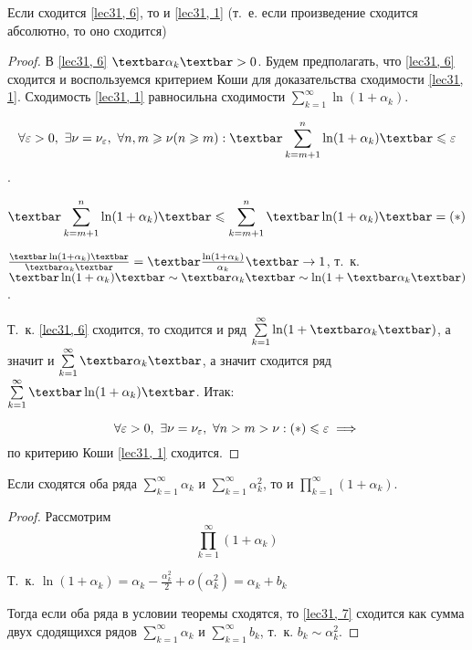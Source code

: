 \documentclass[../../main.tex]{subfiles}
\begin{document}
	\begin{thm}
		Если сходится \eqref{lec31, 6}, то и \eqref{lec31, 1} (т.~е. если 
		произведение сходится абсолютно, то оно сходится)
		\begin{proof}
			В \eqref{lec31, 6} $\textbar\alpha_k\textbar > 0$. Будем предполагать, что 
			\eqref{lec31, 6} сходится и воспользуемся критерием Коши для доказательства 
			сходимости \eqref{lec31, 1}. Сходимость \eqref{lec31, 1} равносильна 
			сходимости $\sum\limits_{k = 1}^{\infty} \ln (1 + \alpha_k)$.
			
			\[\forall \eps > 0,\ \exists \nu = \nu_\eps,\ \forall n, m 
			\geq \nu (n \geq m): \textbar\sum\limits_{k = m + 1}^{n} \ln(1 + 
			\alpha_k)\textbar \leq \eps\].
			
			\[\textbar\sum\limits_{k = m + 1}^{n} \ln(1 + \alpha_k) \textbar \leq 
			\sum\limits_{k = m + 1}^{n} \textbar\ln(1 + \alpha_k)\textbar = (*)\]
			
			$\frac{\textbar\ln(1 + \alpha_k)\textbar}{\textbar\alpha_k\textbar} = 
			\textbar \frac{\ln(1 + \alpha_k)}{\alpha_k}\textbar \to 1$, т.~к. $\textbar 
			\ln(1 + \alpha_k) \textbar \sim \textbar \alpha_k \textbar \sim \ln(1 + 
			\textbar \alpha_k \textbar)$.
			
			Т.~к. \eqref{lec31, 6} сходится, то сходится и ряд $\sum\limits_{k = 
			1}^{\infty} \ln(1 + \textbar \alpha_k \textbar)$, а значит и 
			$\sum\limits_{k = 1}^{\infty} \textbar \alpha_k \textbar$, а значит 
			сходится ряд $\sum\limits_{k = 1}^{\infty} \textbar \ln(1 + \alpha_k) 
			\textbar$. Итак:
			
			\[\forall \varepsilon > 0,\ \exists \nu = \nu_\varepsilon,\ \forall n > m > 
			\nu: (*) \leqslant \varepsilon \implies\]
			по критерию Коши \eqref{lec31, 1} сходится.
		\end{proof}
	\end{thm}

	\begin{thm}
		Если сходятся оба ряда $\sum\limits_{k = 1}^{\infty} \alpha_k$ и 
		$\sum\limits_{k = 1}^{\infty} \alpha_k^2$, то и $\prod\limits_{k = 
		1}^{\infty} (1 + \alpha_k)$.
		
		\begin{proof}
			Рассмотрим 
			\begin{equation}\label{lec31, 7}
				\prod\limits_{k = 1}^{\infty} (1 + \alpha_k)
			\end{equation}
			
			Т.~к. $\ln(1 + \alpha_k) = \alpha_k - \frac{\alpha_k^2}{2} + o(\alpha_k^2) 
			= \alpha_k + b_k$
			
			Тогда если оба ряда в условии теоремы сходятся, то \eqref{lec31, 7} 
			сходится как сумма двух сдодящихся рядов $\sum\limits_{k = 1}^{\infty} 
			\alpha_k$ и $\sum\limits_{k = 1}^{\infty} b_k$, т.~к. $b_k \sim \alpha_k^2$.
		\end{proof}
	\end{thm}
\end{document}
